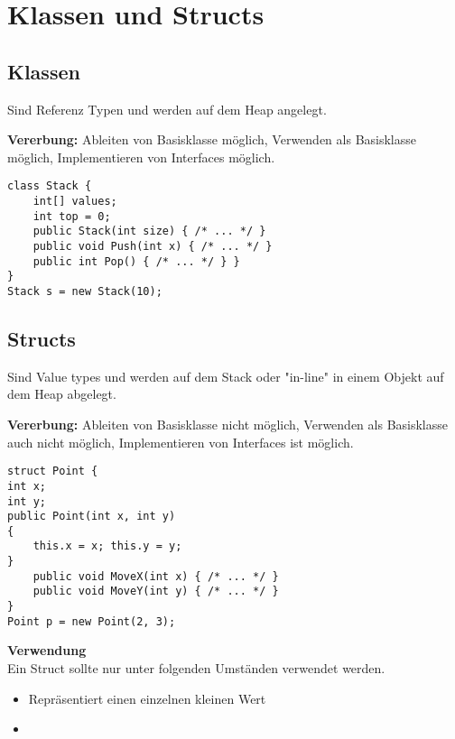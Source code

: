 
\section{Klassen und Structs}

\subsection{Klassen}
Sind Referenz Typen und werden auf dem Heap angelegt.

\textbf{Vererbung:} Ableiten von Basisklasse möglich, Verwenden als Basisklasse möglich, Implementieren von Interfaces möglich.

\begin{lstlisting}
class Stack {
	int[] values;
	int top = 0;
	public Stack(int size) { /* ... */ }
	public void Push(int x) { /* ... */ }
	public int Pop() { /* ... */ } }
}
Stack s = new Stack(10); 
\end{lstlisting}

\subsection{Structs}
Sind Value types und werden auf dem Stack oder "in-line" in einem Objekt auf dem Heap abgelegt.

\textbf{Vererbung:} Ableiten von Basisklasse nicht möglich, Verwenden als Basisklasse auch nicht möglich, Implementieren von Interfaces ist möglich.

\begin{lstlisting}
struct Point {
int x;
int y;
public Point(int x, int y)
{
	this.x = x; this.y = y; 
} 
	public void MoveX(int x) { /* ... */ } 
	public void MoveY(int y) { /* ... */ }
}
Point p = new Point(2, 3); 
\end{lstlisting}

\textbf{Verwendung} \\
Ein Struct sollte nur unter folgenden Umständen verwendet werden.
\begin{itemize}
  \itemsep -0.5em 
  \item Repräsentiert einen einzelnen kleinen Wert
  \item 
\end{itemize}

